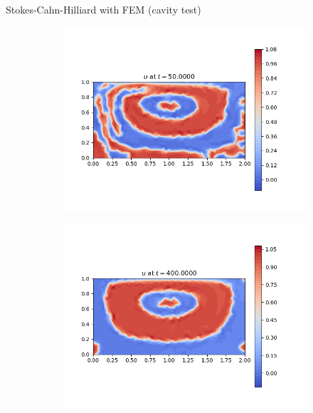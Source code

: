 \begin{frame}{Stokes-Cahn-Hilliard with FEM {\small(cavity test)}}
\begin{figure}[t]
		\begin{subfigure}{0.49\textwidth}
			\centering
			\includegraphics[scale=0.28]{img/stokes-cahn-hilliard/u_FE+Eyre_stokes_nt-40000_t-50.00000_P1.png}
		\end{subfigure}
		\hspace*{-1.5cm}
		\begin{subfigure}{0.49\textwidth}
			\centering
			\includegraphics[scale=0.28]{img/stokes-cahn-hilliard/u_FE+Eyre_stokes_nt-40000_t-400.00000_P1.png}
		\end{subfigure}
	\end{figure}
\end{frame}

